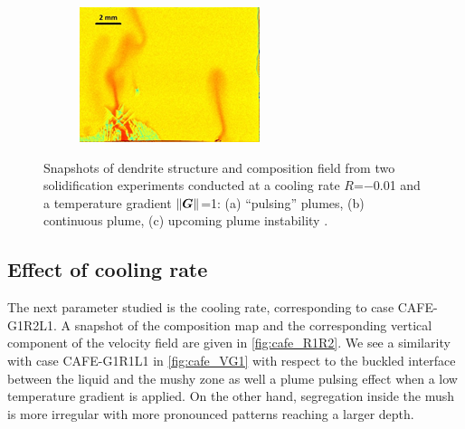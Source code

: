 \begin{figure}[htbp]
\begin{subfigure}{0.3\textwidth}
    \centering
	\includegraphics[width=\textwidth]{Chapter4/Graphics/freckle_exp/exp_instability.png}
	\caption{}
    \label{fig:exp_instability}
  \end{subfigure}
\captionsetup{singlelinecheck=off}
\caption[.]{Snapshots of dendrite structure and composition field from two 
solidification experiments conducted at a cooling rate 
$R$=\SI{-0.01}{\uCR} and a temperature gradient $\lVert \boldsymbol{G} \rVert$=\SI{1}{\ugradT}: (a) “pulsing” plumes, 
(b) continuous plume, (c) upcoming plume instability \citep{shevchenko_chimney_2013}.} 
\label{fig:experimental_freckles_regimes}
\end{figure}


\subsection{Effect of cooling rate}

The next parameter studied is the cooling rate, corresponding to case CAFE-G1R2L1. A snapshot of the composition map 
and the corresponding vertical component of the velocity field are given in \cref{fig:cafe_R1R2}. We see a similarity 
with case CAFE-G1R1L1 in \cref{fig:cafe_VG1} with respect to the buckled interface between the liquid and the mushy 
zone as well a plume pulsing effect when a low temperature gradient is applied. On the other hand, segregation inside 
the mush is more irregular with more pronounced patterns reaching a larger depth. 


